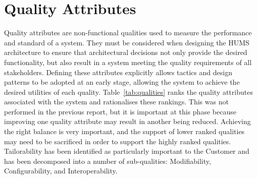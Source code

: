 \documentclass[10pt,a4paper]{article}
\begin{document}
\section{Quality Attributes}
\label{sec:qualities}
Quality attributes are non-functional qualities used to measure the performance and standard of a system. They must be considered when designing the HUMS architecture to ensure that architectural decisions not only provide the desired functionality, but also result in a system meeting the quality requirements of all stakeholders.
Defining these attributes explicitly allows tactics and design patterns to be adopted at an early stage, allowing the system to achieve the desired utilities of each quality. 
Table~\ref{tab:qualities} ranks the quality attributes associated with the system and rationalises these rankings. This was not performed in the previous report, but it is important at this phase because improving one quality attribute may result in another being reduced. Achieving the right balance is very important, and the support of lower ranked qualities may need to be sacrificed in order to support the highly ranked qualities. Tailorability has been identified as particularly important to the Customer and has been decomposed into a number of sub-qualities: Modifiability, Configurability, and Interoperability.
\end{document}
